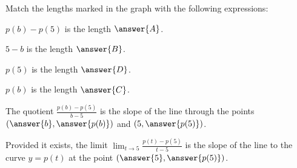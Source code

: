 \documentclass{ximera}
\begin{document}
\begin{exercise}
\begin{image}
\end{image}

Match the lengths marked in the graph with the following expressions:

$p(b)-p(5)$ is the length $\answer{A}$.

$5-b$ is the length $\answer{B}$.

$p(5)$ is the length $\answer{D}$.

$p(b)$ is the length $\answer{C}$.

\begin{exercise}

The quotient $\frac{p(b)-p(5)}{b-5}$ is the slope of the  line through the points $\left(\answer{b},\answer{p(b)}\right)$ and $\left(5,\answer{p(5)}\right)$.

\begin{exercise}

Provided it exists, the limit $\lim_{t\to5}\frac{p(t)-p(5)}{t-5}$ is the slope of the  line to the curve $y=p(t)$ at the point $\left(\answer{5},\answer{p(5)}\right)$.

\end{exercise}
\end{exercise}
\end{exercise}
\end{document}
